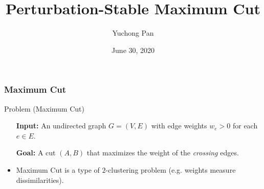 \documentclass{beamer}
\title{Perturbation-Stable Maximum Cut}
\author{Yuchong Pan}
\institute{UBC Beyond Worst-Case Analysis Seminars}
\date{June 30, 2020}
\begin{document}
    \frame{\titlepage}

    \begin{frame}
        \frametitle{{\sc Maximum Cut}}
    
        \begin{block}{Problem ({\sc Maximum Cut})}
            \setlength{\leftmargini}{3.25em}
            \begin{itemize}
                \item[\bf Input:] An undirected graph $G = (V, E)$ with edge weights $w_e > 0$ for each $e \in E$.
                \item[\bf Goal:] A cut $(A, B)$ that maximizes the weight of the \emph{crossing} edges. 
            \end{itemize}
        \end{block}

        \pause

        \begin{itemize}
            \item {\sc Maximum Cut} is a type of $2$-clustering problem (e.g. weights measure dissimilarities).
        \end{itemize}
    \end{frame}
\end{document}
